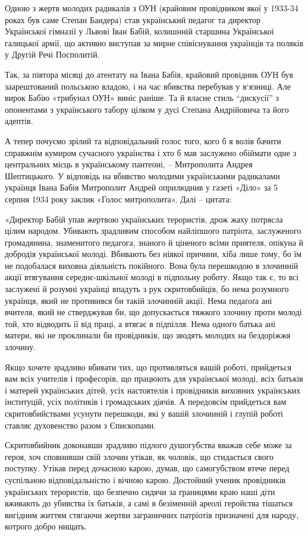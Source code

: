 Одною з жертв молодих радикалів з ОУН (крайовим провідником якої у 1933-34
роках був саме Степан Бандера) став український педагог та директор Української
гімназії у Львові Іван Бабій, колишнній  старшина Української галицької армії,
що активно виступав за мирне співіснування українців та поляків у Другій  Речі
Посполитій.

Так, за півтора місяці до атентату на Івана Бабія, крайовий провідник ОУН був
заарештований польською владою, і на час вбивства перебував у в‘язниці. Але
вирок Бабію «трибунал ОУН» виніс раніше. Та й власне стиль \enquote{дискусії} з
опонентами з українського табору цілком у дусі Степана Андрійовича та його
адептів.

А тепер почуємо зрілий та відповідальний голос того, кого б я волів бачити
справжнім кумиром сучасного українства і хто б мав заслужено обіймати одне з
центральних місць в українському пантеоні, – Митрополита Андрея Шептицького. У
відповідь на вбивство молодими українськими радикалами українця Івана Бабія
Митрополит Андрей оприлюднив у газеті «Діло» за 5 серпня 1934 року заклик
«Голос митрополита». Далі – цитата:

«Директор Бабій упав жертвою українських терористів, дрож жаху потрясла цілим
народом. Убивають зрадливим способом найліпшого патріота, заслуженого
громадянина, знаменитого педагога, знаного й ціненого всіми приятеля, опікуна й
добродія української молоді. Вбивають без ніякої причини, хіба лише тому, бо їм
не подобалася виховна діяльність покійного. Вона була перешкодою в злочинній
акції втягування середнє-шкільної молоді в підпольну роботу. Якщо так є, то всі
заслужені й розумні українці впадуть з рук скритовбийців, бо нема розумного
українця, який не противився би такій злочинній акції. Нема педаґоґа ані
вчителя, який не стверджував би, що допускається тяжкого злочину проти молоді
той, хто відводить її від праці, а втягає в підпілля. Нема одного батька ані
матери, які не проклинали би провідників, що зводять молодих на бездоріжжя
злочину.

Якщо хочете зрадливо вбивати тих, що противляться вашій роботі, прийдеться вам
всіх учителів і професорів, що працюють для української молоді, всіх батьків і
матерей українських дітей, усіх настоятелів і провідників виховних українських
інституцій, усіх політиків і громадських діячів. А передовсім прийдеться вам
скритовбийствами усунути перешкоди, які у вашій злочинній і глупій роботі
ставляє духовенство разом з Єпископами.

Скритовбийник доконавши зрадливо підлого душогубства вважав себе може за героя,
хоч сповнивши свій злочин утікав, як чоловік, що стидається свого поступку.
Утікав перед дочасною карою, думав, що самогубством втече перед суспільною
відповідальністю і вічною карою. Достойний ученик провідників українських
терористів, що безпечно сидячи за границями краю наші діти вживають до убивства
їх батьків, а самі в безіменній ареолі геройства тішаться вигідним життям
стягаючи жертви заграничних патріотів призначені для народу, котрого добро
нищать.

